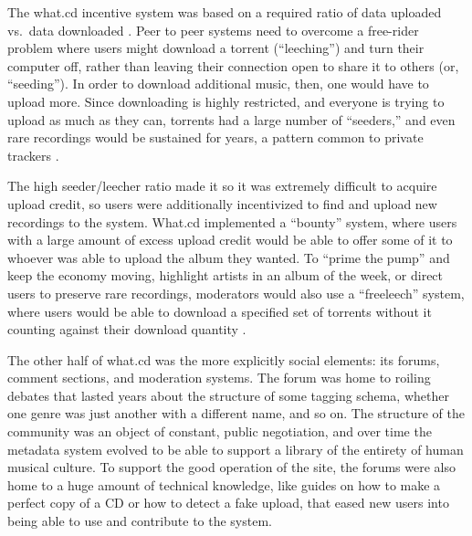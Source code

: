 The what.cd incentive system was based on a required ratio of data
uploaded vs.~data downloaded \citep{jiaHowSurviveThrive2013} .
Peer to peer systems need to overcome a free-rider problem where users
might download a torrent (``leeching'') and turn their computer off,
rather than leaving their connection open to share it to others (or,
``seeding''). In order to download additional music, then, one would
have to upload more. Since downloading is highly restricted, and
everyone is trying to upload as much as they can, torrents had a large
number of ``seeders,'' and even rare recordings would be sustained for
years, a pattern common to private trackers \citep{liuUnderstandingImprovingRatio2010} .

The high seeder/leecher ratio made it so it was extremely difficult to
acquire upload credit, so users were additionally incentivized to find
and upload new recordings to the system. What.cd implemented a
``bounty'' system, where users with a large amount of excess upload
credit would be able to offer some of it to whoever was able to upload
the album they wanted. To ``prime the pump'' and keep the economy
moving, highlight artists in an album of the week, or direct users to
preserve rare recordings, moderators would also use a ``freeleech''
system, where users would be able to download a specified set of
torrents without it counting against their download quantity \citep{kashEconomicsBitTorrentCommunities2012, chenImprovingSustainabilityPrivate2011a} .

The other half of what.cd was the more explicitly social elements: its
forums, comment sections, and moderation systems. The forum was home to
roiling debates that lasted years about the structure of some tagging
schema, whether one genre was just another with a different name, and so
on. The structure of the community was an object of constant, public
negotiation, and over time the metadata system evolved to be able to
support a library of the entirety of human musical culture. To support the good operation of the
site, the forums were also home to a huge amount of technical knowledge,
like guides on how to make a perfect copy of a CD or how to detect a
fake upload, that eased new users into being able to use and contribute
to the system.

